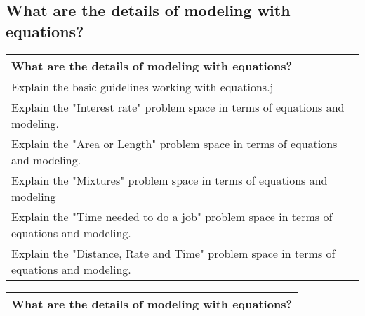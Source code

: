 \subsection{What are the details of modeling with equations?}
\begin{small}
    \begin{tabularx}{1\textwidth}{
            p{}
        }
        \toprule
        What are the details of modeling with equations?
        \\
        \midrule

        Explain the basic guidelines working with equations.j
        \\
        \midrule

        Explain the "Interest rate" problem space in terms of equations and
        modeling.
        \\
        \midrule

        Explain the "Area or Length" problem space in terms of equations and
        modeling.
        \\
        \midrule

        Explain the "Mixtures" problem space in terms of equations and modeling
        \\
        \midrule

        Explain the "Time needed to do a job" problem space in terms of
        equations and modeling.
        \\
        \midrule

        Explain the "Distance, Rate and Time" problem space in terms of
        equations and modeling.
        \\
        \bottomrule
    \end{tabularx}
\end{small}
\begin{small}
    \begin{tabularx}{1\textwidth}{
            p{}
        }
        \toprule
        What are the details of modeling with equations?
        \\
        \bottomrule
    \end{tabularx}
\end{small}
